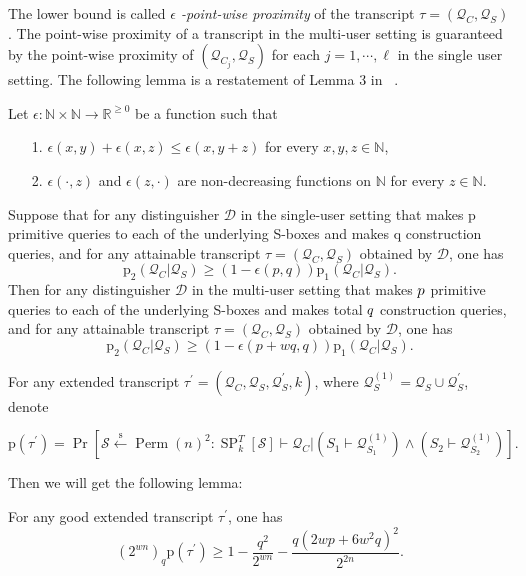 The lower bound is called \emph{$\epsilon$ -point-wise proximity} of the transcript $\tau = (\mathcal{Q}_C, \mathcal{Q}_S)$. The point-wise proximity of a transcript in the multi-user setting is guaranteed by the point-wise proximity of $(\mathcal{Q}_{C_{j}}, \mathcal{Q}_S)$ for each $j = 1, \cdots ,\ell$ in the single user setting. The following lemma is a restatement of Lemma 3  in ~\cite{hoang2016key}.

\begin{lemma}
\label{lemma:point-wise}

Let $\epsilon : \mathbb{N} \times \mathbb{N} \rightarrow \mathbb{R}^{\geq 0}$ be a function such that
	\begin{itemize}
		\item[1.]
		$\epsilon (x, y) + \epsilon (x, z) \leq \epsilon (x, y + z)$ for every $x, y, z \in \mathbb{N}$,
		\item[2.]
		$\epsilon (\cdot, z)$ and $\epsilon (z, \cdot)$ are non-decreasing functions on $\mathbb{N}$ for every $z \in \mathbb{N}$.
	\end{itemize}
Suppose that for any distinguisher $\mathcal{D}$ in the single-user setting that makes p primitive queries to each of the underlying S-boxes and makes q construction queries, and for any attainable transcript $\tau = (\mathcal{Q}_C, \mathcal{Q}_S)$ obtained by $\mathcal{D}$, one has
%
$$
\mathrm{p}_{2}\left(\mathcal{Q}_{C} | \mathcal{Q}_{S}\right) \geq (1 - \epsilon(p,q)) \mathrm{p}_{1}\left(\mathcal{Q}_{C} | \mathcal{Q}_{S}\right).
$$
%
Then for any distinguisher $\mathcal{D}$ in the multi-user setting that makes $\mathnormal{p}$ primitive queries to each of the underlying S-boxes and makes total $\mathnormal{q}$ construction queries, and for any attainable transcript $\tau = (\mathcal{Q}_C, \mathcal{Q}_S)$ obtained by $\mathcal{D}$, one has
%
$$
\mathrm{p}_{2}\left(\mathcal{Q}_{C} | \mathcal{Q}_{S}\right) \geq (1 - \epsilon(p + wq,q)) \mathrm{p}_{1}\left(\mathcal{Q}_{C} | \mathcal{Q}_{S}\right).
$$
\end{lemma}



For any extended transcript $\tau^{\prime} = (\mathcal{Q}_C, \mathcal{Q}_S, \mathcal{Q}_S^{\prime},k)$, where $\mathcal{Q}_{S}^{(1)} = \mathcal{Q}_S \cup \mathcal{Q}_S^{\prime}$, denote

$$
\mathrm{p}\left(\tau^{\prime}\right)=\operatorname{Pr}\left[\mathcal{S} \stackrel{\mathrm{s}}{\leftarrow} \operatorname{Perm}(n)^{2}: \mathrm{\operatorname{SP}}^{T}_{k}[\mathcal{S}] \vdash \mathcal{Q}_{C} |\left(S_{1} \vdash \mathcal{Q}_{S_{1}}^{(1)}\right) \wedge\left(S_{2} \vdash \mathcal{Q}_{S_{2}}^{(1)}\right)\right].
$$

Then we will get the following lemma:

\begin{lemma}
\label{lemma:ratio-2-rounds}

For any good extended transcript $\tau^{\prime}$, one has
$$
\left(2^{w n}\right)_{q} \mathrm{p}\left(\tau^{\prime}\right) \geq 1-\frac{q^{2}}{2^{w n}}-\frac{q\left(2 w p+6 w^{2} q\right)^{2}}{2^{2 n}}.
$$
\end{lemma}


